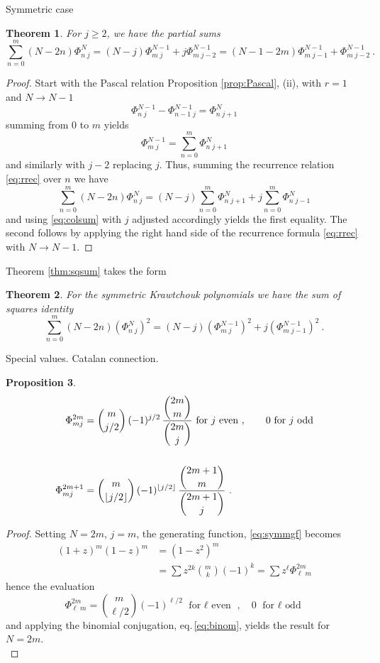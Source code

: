 \documentclass[12pt,reqno]{amsart}
\newtheorem{theorem}{Theorem}[section]   %
\newtheorem{proposition}[theorem]{Proposition}  %
\newcommand{\bbinom}[2]{\genfrac{(}{)}{0pt}{0}{#1}{#2}}
\newcommand{\FF}[2]{\Phi^{#1}_{#2}}
\begin{document}
\begin{section}{Symmetric case}
\begin{theorem}\label{thm:sum}
For $j\ge2$, we have the partial sums
$$\sum_{n=0}^m (N-2n)\FF{N}{n\;j}=(N-j)\FF{N-1}{m\;j}+j\FF{N-1}{m\;j-2}=(N-1-2m)\FF{N-1}{m\;j-1}+\FF{N-1}{m\;j-2} \ .$$
\end{theorem}
\begin{proof}
Start with the Pascal relation Proposition \ref{prop:Pascal}, (ii), with $r=1$ and $N\rightarrow N-1$
$$\FF {N-1}{n  \;j} -\FF {N-1}{n-1  \;j} = \FF {N}{n\;j+1}$$
summing from $0$ to $m$ yields
\begin{equation}\label{eq:colsum}
\FF{N-1}{m\;j}=\sum_{n=0}^m \FF {N}{n\;j+1}
\end{equation}
and similarly with $j-2$ replacing $j$. Thus, summing the recurrence relation \eqref{eq:rrec} over $n$ we have
$$\sum_{n=0}^m (N-2n)\FF N{n\;j}= (N-j)\sum_{n=0}^m\FF N{n\;j+1}+j \sum_{n=0}^m\FF N{n\;j-1} $$
and using \eqref{eq:colsum} with $j$ adjusted accordingly yields the first equality. The second follows by applying the right hand side of the recurrence formula \eqref{eq:rrec}
with $N\rightarrow N-1$.
\end{proof}

Theorem \ref{thm:sqsum} takes the form
\begin{theorem}
For the symmetric Krawtchouk polynomials we have the sum of squares identity
$$\sum_{n=0}^m (N-2n)(\FF N{n\;j})^2=(N-j)(\FF {N-1}{m\;j})^2+j(\FF {N-1}{m\;j-1})^2\ .$$
\end{theorem}
\begin{subsection}{Special values. Catalan connection.}
\begin{proposition}
\begin{align}\label{eq:Cat1}
\Phi_{mj}^{2m} &=  \bbinom{m}{ j/2}\, (-1)^{j/2}\, \frac{\bbinom{2m}{m} }{\bbinom{2m}{j} } \ \text{for $j$ even\ }, \qquad 0 \text{\ for $j$ odd} \\
\mathstrut\nonumber \\
\Phi_{mj}^{2m+1} &= \bbinom{m}{ \lfloor j/2 \rfloor}\, (-1)^{\lfloor j/2\rfloor}\, \frac{\bbinom{2m+1}{m} }{\bbinom{2m+1}{j} }\ . \label{eq:Cat2}
\end{align}
\end{proposition}
\begin{proof}
Setting $N=2m$, $j=m$, the generating function, \eqref{eq:symmgf} becomes
\begin{align*}
(1+z)^m(1-z)^m&=(1-z^2)^m\\
&=\sum z^{2k}\binom{m}{k}(-1)^k=\sum z^\ell \FF{2m}{\ell\;m}
\end{align*}
hence the evaluation
$$
\FF{2m}{\ell\;m}=\binom{m}{\ell/2}(-1)^{\ell/2} \text{ for $\ell$ even }, \quad 0 \text{ for $\ell$ odd}
$$
and applying the binomial conjugation, eq.\,\eqref{eq:binom}, yields the result for $N=2m$.\\


\end{proof}
\end{subsection}
\end{section}
\end{document}
